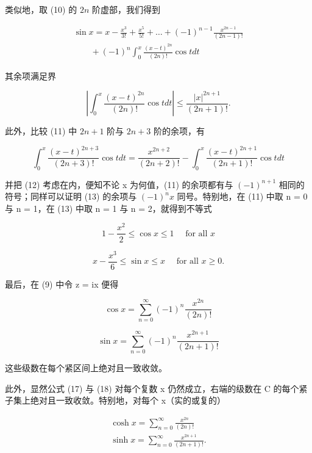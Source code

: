 类似地，取 (10) 的 \(2n\) 阶虚部，我们得到

\[
\begin{array}{l} \sin x = x - \frac {x ^ {3}}{3 !} + \frac {x ^ {5}}{5 !} + \dots + (- 1) ^ {n - 1} \frac {x ^ {2 n - 1}}{(2 n - 1) !} \\ \qquad + (- 1) ^ {n} \int_ {0} ^ {x} \frac {(x - t) ^ {2 n}}{(2 n) !} \cos t d t \end{array}\tag{13}
\]

其余项满足界

\[
\left| \int_ {0} ^ {x} \frac {(x - t) ^ {2 n}}{(2 n) !} \cos t d t \right| \leqslant \frac {| x | ^ {2 n + 1}}{(2 n + 1) !}.\tag{14}
\]

此外，比较 (11) 中 \(2n + 1\) 阶与 \(2n + 3\) 阶的余项，有

\[
\int_ {0} ^ {x} \frac {(x - t) ^ {2 n + 3}}{(2 n + 3) !} \cos t d t = \frac {x ^ {2 n + 2}}{(2 n + 2) !} - \int_ {0} ^ {x} \frac {(x - t) ^ {2 n + 1}}{(2 n + 1) !} \cos t d t
\]

并把 (12) 考虑在内，便知不论 x 为何值，(11) 的余项都有与 \((-1)^{n+1}\) 相同的符号；同样可以证明 (13) 的余项与 \((-1)^{n}x\) 同号。特别地，在 (11) 中取 n = 0 与 n = 1，在 (13) 中取 n = 1 与 n = 2，就得到不等式

\[
1 - \frac {x ^ {2}}{2} \leqslant \cos x \leqslant 1 \quad \text { for   all } x\tag{15}
\]

\[
x - \frac {x ^ {3}}{6} \leqslant \sin x \leqslant x \quad \text { for   all } x \geqslant 0.\tag{16}
\]

最后，在 (9) 中令 z = ix 便得

\[
\cos x = \sum_ {n = 0} ^ {\infty} (- 1) ^ {n} \frac {x ^ {2 n}}{(2 n) !}\tag{17}
\]

\[
\sin x = \sum_ {n = 0} ^ {\infty} (- 1) ^ {n} \frac {x ^ {2 n + 1}}{(2 n + 1) !}\tag{18}
\]

这些级数在每个紧区间上绝对且一致收敛。

此外，显然公式 (17) 与 (18) 对每个复数 x 仍然成立，右端的级数在 C 的每个紧子集上绝对且一致收敛。特别地，对每个 x（实的或复的）

\[
\begin{array}{l} \cosh x = \sum_ {n = 0} ^ {\infty} \frac {x ^ {2 n}}{(2 n) !} \\ \sinh x = \sum_ {n = 0} ^ {\infty} \frac {x ^ {2 n + 1}}{(2 n + 1) !}. \end{array}
\]

